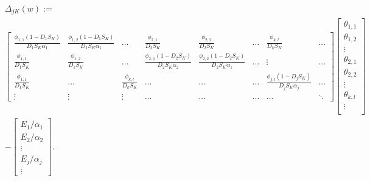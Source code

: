 \documentclass[12pt]{article}
\begin{document}
\begin{equation}
    \label{eq:delta_matrix}
    \begin{split}
        &\Delta_{jK}(w) := \\
        &\begin{bmatrix}
            \frac{\phi_{1,1}(1-D_1S_K)}{D_1S_K\alpha_1} & \frac{\phi_{1,2}(1-D_1S_K)}{D_1S_K\alpha_1} & \dots & \frac{\phi_{2,1}}{D_2S_K} & \frac{\phi_{2,2}}{D_2S_K} & \dots & \frac{\phi_{k,l}}{D_kS_K} & \dots \\
            \frac{\phi_{1,1}}{D_1S_K} & \frac{\phi_{1,2}}{D_1S_K} & \dots & \frac{\phi_{2,1}(1-D_2S_K)}{D_2S_K\alpha_2} & \frac{\phi_{2,2}(1-D_2S_K)}{D_2S_K\alpha_1} & \dots & \vdots & \dots\\
            \frac{\phi_{1,1}}{D_1S_K} & \dots & \frac{\phi_{k,l}}{D_kS_K} & \dots & \dots & \dots & \frac{\phi_{j,l}(1-D_jS_K)}{D_jS_K\alpha_j} & \dots\\
            \vdots & \vdots & \vdots & \dots & \dots & \dots & \dots &\ddots
        \end{bmatrix}
        \begin{bmatrix}
            \theta_{1,1} \\
            \theta_{1,2} \\
            \vdots \\
            \theta_{2,1} \\
            \theta_{2,2} \\
            \vdots \\
            \theta_{k,l} \\
            \vdots \\
        \end{bmatrix}\\
        &-
        \begin{bmatrix}
            E_1/\alpha_1 \\
            E_2/\alpha_2 \\
            \vdots \\
            E_j/\alpha_j \\
            \vdots
        \end{bmatrix}
        .
    \end{split}
\end{equation}
\end{document}
